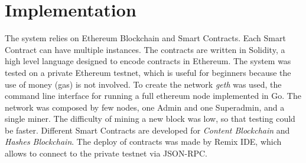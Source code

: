 \documentclass[conference,compsoc]{IEEEtran}
\begin{document}
\section{Implementation}
\label{Implementation}
The system relies on Ethereum Blockchain and Smart Contracts. Each Smart Contract can have multiple instances. 
The contracts are written in Solidity, a high level language designed to encode contracts in Ethereum. The system was tested on a private Ethereum testnet, which is useful for beginners because the use of money (gas) is not involved. To create the network \textit{geth} was used, the command line interface for running a full ethereum node implemented in Go. The network was composed by few nodes, one Admin and one Superadmin, and a single miner. The difficulty of mining a new block was low, so that testing could be faster.
Different Smart Contracts are developed for \textit{Content Blockchain} and \textit{Hashes Blockchain}. The deploy of contracts was made by Remix IDE, which allows to connect to the private testnet via JSON-RPC. 
\end{document}
